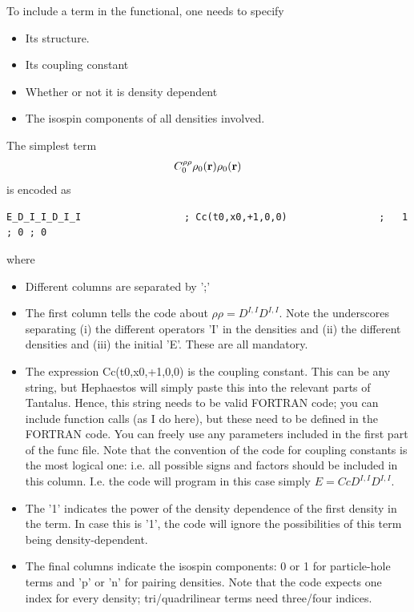 \documentclass[print,amsmath,amssymb,aps,prc,nofootinbib,notitlepage]{revtex4-1}
\renewcommand{\vec}[1]{{\bf #1}}
\begin{document}
To include a term in the functional, one needs to specify
%
\begin{itemize}
\item Its structure.
\item Its coupling constant
\item Whether or not it is density dependent 
\item The isospin components of all densities involved. 
\end{itemize}
%
The simplest term
%
\begin{align}
C^{\rho \rho}_0 \rho_0(\vec{r}) \rho_0(\vec{r})
\end{align}
%
is encoded as
%
\begin{Verbatim}
E_D_I_I_D_I_I                  ; Cc(t0,x0,+1,0,0)                ;   1    ; 0 ; 0      
\end{Verbatim}
%
where
\begin{itemize}
\item Different columns are separated by ';'
\item The first column tells the code about $\rho \rho = D^{I,I} D^{I,I}$. 
      Note the underscores separating (i) the different operators 'I' in the densities 
      and (ii) the different densities and (iii) the initial 'E'. These are all
      mandatory.
\item The expression \textrm{ Cc(t0,x0,+1,0,0) } is the coupling constant. This
      can be any string, but Hephaestos will simply paste this into the relevant
      parts of Tantalus. Hence, this string needs to be valid FORTRAN code; 
      you can include function calls (as I do here), but these need to be 
      defined in the FORTRAN code. You can freely use any parameters included
      in the first part of the func file. Note that the convention of the 
      code for coupling constants is the most logical one: i.e. \textsf{all possible
      signs and factors} should be included in this column. I.e. the code will
      program in this case simply $E = Cc D^{I,I} D^{I,I}$.
\item The '1' indicates the power of the density dependence of the first 
      density in the term. In case this is '1', the code will ignore the 
      possibilities of this term being density-dependent.
\item The final columns indicate the isospin components: 0 or 1 for particle-hole
      terms and 'p' or 'n' for pairing densities. Note that the code expects one
      index for every density; tri/quadrilinear terms need three/four indices.
\end{itemize}
\end{document}

